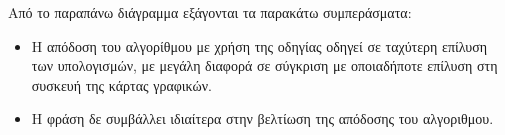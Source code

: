 Από το παραπάνω διάγραμμα εξάγονται τα παρακάτω συμπεράσματα:
\begin{itemize}
\item{H απόδοση του αλγορίθμου με χρήση της οδηγίας \emph{} οδηγεί σε ταχύτερη επίλυση των υπολογισμών, με μεγάλη διαφορά σε σύγκριση με οποιαδήποτε επίλυση στη συσκευή της κάρτας γραφικών.}
\item{Η φράση \emph{} δε συμβάλλει ιδιαίτερα στην βελτίωση της απόδοσης του αλγοριθμου.}
\end{itemize}
